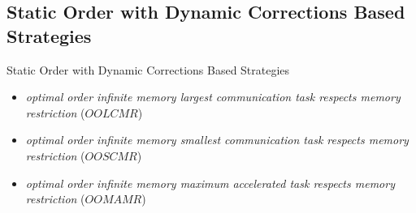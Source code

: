\documentclass[mathserif,hyperref={pdfpagemode=FullScreen}]{beamer}
\begin{document}
\subsection{Static Order with Dynamic Corrections Based Strategies}
\begin{frame}{Static Order with Dynamic Corrections Based Strategies}
\begin{itemize}
	\vfill
	\item \textit{optimal order infinite memory largest communication task respects memory restriction} ($OOLCMR$)
	\vfill
	\item \textit{optimal order infinite memory smallest communication task respects memory restriction} ($OOSCMR$)
	\vfill
	\item \textit{optimal order infinite memory maximum accelerated task respects memory restriction} ($OOMAMR$)
	\vfill
\end{itemize}
\end{frame}
\end{document}
